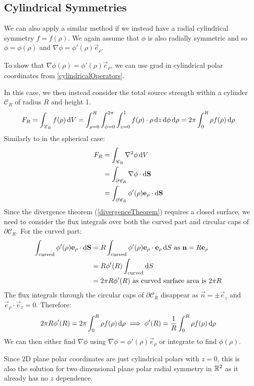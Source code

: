 \documentclass[../main.tex]{subfiles}
\begin{document}
\subsection{Cylindrical Symmetries}
\label{gaussFluxCylindrical}
We can also apply a similar method if we instead have a radial cylindrical symmetry $f = f(\rho)$.
We again assume that $\phi$ is also radially symmetric and so $\phi = \phi(\rho)$ and $\nabla \phi = \phi'(\rho) \vec{e}_\rho$.
\begin{remark}[Note]
  To show that $\nabla \phi(\rho) = \phi'(\rho) \vec{e}_\rho$, we can use grad in cylindrical polar coordinates from \cref{cylindricalOperators}.
\end{remark}
In this case, we then instead consider the total source strength within a cylinder $\mathscr{C}_R$ of radius $R$ and height 1.
\[
  F_R = \int_{\mathscr{C}_R} f(\rho) \d{V} = \int_{\rho = 0}^{R} \int_{\phi = 0}^{2\pi} \int_{z = 0}^{1} f(\rho) \cdot \rho \d{z} \d{\phi} \d{\rho} = 2\pi \int_{0}^{R} \rho f(\rho) \d{\rho}
\]
Similarly to in the spherical case:
\begin{align*}
  F_R &= \int_{\mathscr{C}_R} \nabla^2 \phi \d{V} \\
      &= \int_{\partial \mathscr{C}_R} \nabla \phi \cdot \d{\vec{S}} \\
      &= \int_{\partial \mathscr{C}_R} \phi'(\rho)\vec{e}_\rho \cdot \d{\vec{S}}
\end{align*}
Since the divergence theorem (\cref{divergenceTheorem}) requires a closed surface, we need to consider the flux integrals over both the curved part and circular caps of $\partial \mathscr{C}_R$.
For the curved part:
\begin{align*}
  \int_{\text{curved}} \phi'(\rho)\vec{e}_\rho \cdot \d{\vec{S}} &= R\int_{\text{curved}} \phi'(\rho) \vec{e}_\rho \cdot \vec{e}_\rho \d{S} \text{ as $\vec{n} = R \vec{e}_\rho$} \\
                                                                 &= R\phi'(R) \int_{\text{curved}} \d{S} \\
                                                                 &= 2\pi R \phi'(R) \text{ as curved surface area is $2\pi R$}
\end{align*}
The flux integrals through the circular caps of $\partial \mathscr{C}_R$ disappear as $\vec{n} = \pm \vec{e}_z$ and $\vec{e}_\rho \cdot \vec{e}_z = 0$.
Therefore:
\[
  2\pi R \phi'(R) = 2\pi \int_{0}^{R} \rho f(\rho) \d{\rho} \implies \phi'(R) = \frac{1}{R} \int_{0}^{R} \rho f(\rho) \d{\rho}
\]
We can then either find $\nabla \phi$ using $\nabla \phi = \phi'(\rho)\vec{e}_\rho$ or integrate to find $\phi(\rho)$.
\begin{remark}
  Since 2D plane polar coordinates are just cylindrical polars with $z = 0$, this is also the solution for two dimensional plane polar radial symmetry in $\mathbb{R}^2$ as it already has no $z$ dependence.
\end{remark}
\end{document}
